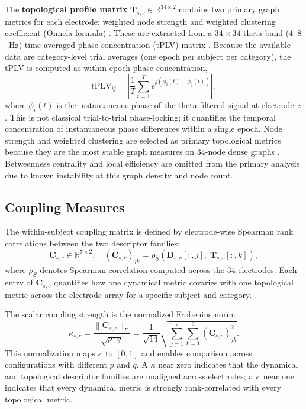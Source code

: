 The \textbf{topological profile matrix} $\mathbf{T}_{s,c} \in \mathbb{R}^{34 \times 2}$ contains two primary graph metrics for each electrode: weighted node strength and weighted clustering coefficient (Onnela formula) \cite{onnela_intensity_2005}. These are extracted from a $34 \times 34$ theta-band ($4$--$8$~Hz) time-averaged phase concentration (tPLV) matrix \cite{lachaux_measuring_1999}. Because the available data are category-level trial averages (one epoch per subject per category), the tPLV is computed as within-epoch phase concentration,
\begin{equation}
\label{eq:tplv}
\text{tPLV}_{ij} = \left|\frac{1}{T}\sum_{t=1}^{T} e^{j(\phi_i(t) - \phi_j(t))}\right|,
\end{equation}
where $\phi_i(t)$ is the instantaneous phase of the theta-filtered signal at electrode~$i$. This is not classical trial-to-trial phase-locking; it quantifies the temporal concentration of instantaneous phase differences within a single epoch. Node strength and weighted clustering are selected as primary topological metrics because they are the most stable graph measures on 34-node dense graphs \cite{rubinov_complex_2010}. Betweenness centrality and local efficiency are omitted from the primary analysis due to known instability at this graph density and node count.

\subsection{Coupling Measures}

The within-subject coupling matrix is defined by electrode-wise Spearman rank correlations between the two descriptor families:
\begin{equation}
\label{eq:coupling_C}
\mathbf{C}_{s,c} \in \mathbb{R}^{7 \times 2}, \quad (\mathbf{C}_{s,c})_{jk} = \rho_S(\mathbf{D}_{s,c}[:,j],\;\mathbf{T}_{s,c}[:,k]),
\end{equation}
where $\rho_S$ denotes Spearman correlation computed across the 34 electrodes. Each entry of $\mathbf{C}_{s,c}$ quantifies how one dynamical metric covaries with one topological metric across the electrode array for a specific subject and category.

The scalar coupling strength is the normalized Frobenius norm:
\begin{equation}
\label{eq:kappa}
\kappa_{s,c} = \frac{\|\mathbf{C}_{s,c}\|_F}{\sqrt{p \cdot q}} = \frac{1}{\sqrt{14}}\sqrt{\sum_{j=1}^{7}\sum_{k=1}^{2}(\mathbf{C}_{s,c})_{jk}^2}.
\end{equation}
This normalization maps $\kappa$ to $[0,1]$ and enables comparison across configurations with different $p$ and $q$. A $\kappa$ near zero indicates that the dynamical and topological descriptor families are unaligned across electrodes; a $\kappa$ near one indicates that every dynamical metric is strongly rank-correlated with every topological metric.

